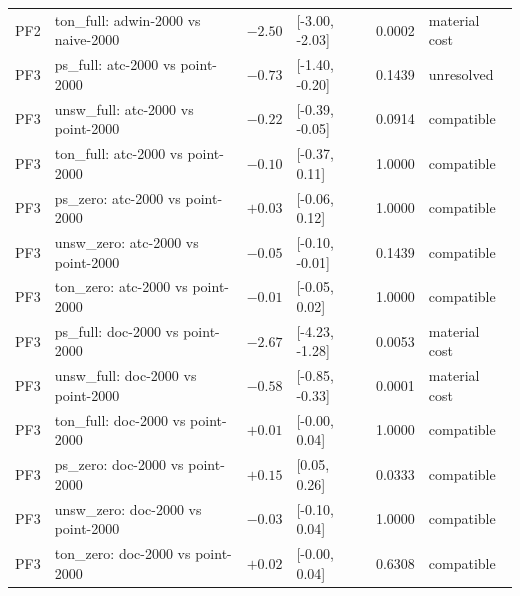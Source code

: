 \begin{table}[t]
\begin{tabular}{l l r l r l}
PF2 & ton\_full: adwin-2000 vs naive-2000 & $-2.50$ & [-3.00, -2.03] & 0.0002 & material cost \\
PF3 & ps\_full: atc-2000 vs point-2000 & $-0.73$ & [-1.40, -0.20] & 0.1439 & unresolved \\
PF3 & unsw\_full: atc-2000 vs point-2000 & $-0.22$ & [-0.39, -0.05] & 0.0914 & compatible \\
PF3 & ton\_full: atc-2000 vs point-2000 & $-0.10$ & [-0.37, 0.11] & 1.0000 & compatible \\
PF3 & ps\_zero: atc-2000 vs point-2000 & $+0.03$ & [-0.06, 0.12] & 1.0000 & compatible \\
PF3 & unsw\_zero: atc-2000 vs point-2000 & $-0.05$ & [-0.10, -0.01] & 0.1439 & compatible \\
PF3 & ton\_zero: atc-2000 vs point-2000 & $-0.01$ & [-0.05, 0.02] & 1.0000 & compatible \\
PF3 & ps\_full: doc-2000 vs point-2000 & $-2.67$ & [-4.23, -1.28] & 0.0053 & material cost \\
PF3 & unsw\_full: doc-2000 vs point-2000 & $-0.58$ & [-0.85, -0.33] & 0.0001 & material cost \\
PF3 & ton\_full: doc-2000 vs point-2000 & $+0.01$ & [-0.00, 0.04] & 1.0000 & compatible \\
PF3 & ps\_zero: doc-2000 vs point-2000 & $+0.15$ & [0.05, 0.26] & 0.0333 & compatible \\
PF3 & unsw\_zero: doc-2000 vs point-2000 & $-0.03$ & [-0.10, 0.04] & 1.0000 & compatible \\
PF3 & ton\_zero: doc-2000 vs point-2000 & $+0.02$ & [-0.00, 0.04] & 0.6308 & compatible \\
\bottomrule
\end{tabular}
\end{table}
